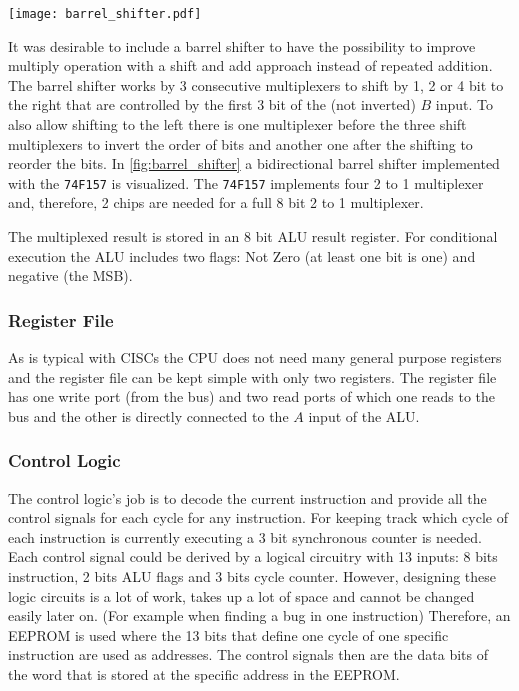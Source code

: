 \begin{sidewaysfigure}[p]
  \centering
  \texttt{[image: barrel\_shifter.pdf]}
  \caption{8 bit bidirectional barrel shifter.}
  \label{fig:barrel_shifter}
\end{sidewaysfigure}
It was desirable to include a barrel shifter to have the possibility to improve multiply operation with a shift and add approach instead of repeated addition.
The barrel shifter works by 3 consecutive multiplexers to shift by 1, 2 or 4 bit to the right that are controlled by the first 3 bit of the (not inverted) $B$ input.
To also allow shifting to the left there is one multiplexer before the three shift multiplexers to invert the order of bits and another one after the shifting to reorder the bits.
In \cref{fig:barrel_shifter} a bidirectional barrel shifter implemented with the \texttt{74F157} is visualized. The \texttt{74F157} implements four 2 to 1 multiplexer and, therefore, 2 chips are needed for a full 8 bit 2 to 1 multiplexer.

The multiplexed result is stored in an 8 bit \gls{ALU} result register.
For conditional execution the \gls{ALU} includes two flags: Not Zero (at least one bit is one) and negative (the \gls{MSB}).

\subsubsection{Register File}
As is typical with \glspl{CISC} the \gls{CPU} does not need many general purpose registers and the register file can be kept simple with only two registers.
The register file has one write port (from the bus) and two read ports of which one reads to the bus and the other is directly connected to the $A$ input of the \gls{ALU}.
\subsubsection{Control Logic}\label{ssec:cl}
The control logic's job is to decode the current instruction and provide all the control signals for each cycle for any instruction.
For keeping track which cycle of each instruction is currently executing a 3 bit synchronous counter is needed.
Each control signal could be derived by a logical circuitry with 13 inputs: 8 bits instruction, 2 bits \gls{ALU} flags and 3 bits cycle counter.
However, designing these logic circuits is a lot of work, takes up a lot of space and cannot be changed easily later on. (For example when finding a bug in one instruction)
Therefore, an \gls{EEPROM} is used where the 13 bits that define one cycle of one specific instruction are used as addresses.
The control signals then are the data bits of the word that is stored at the specific address in the \gls{EEPROM}.

